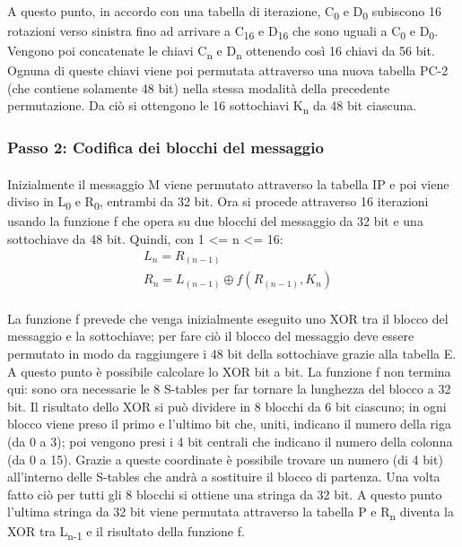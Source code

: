 \documentclass{article}
\begin{document}
				\paragraph{}
				A questo punto, in accordo con una tabella di iterazione, C\textsubscript{0} e D\textsubscript{0} subiscono 16 rotazioni verso sinistra fino ad arrivare a C\textsubscript{16} e D\textsubscript{16} che sono uguali a C\textsubscript{0} e D\textsubscript{0}. Vengono poi concatenate le chiavi C\textsubscript{n} e D\textsubscript{n} ottenendo così 16 chiavi da 56 bit. \newline
				Ognuna di queste chiavi viene poi permutata attraverso una nuova tabella PC-2 (che contiene solamente 48 bit) nella stessa modalità della precedente permutazione. Da ciò si ottengono le 16 sottochiavi K\textsubscript{n} da 48 bit ciascuna.

			\subsubsection{Passo 2: Codifica dei blocchi del messaggio}

				\paragraph{}
				Inizialmente il messaggio M viene permutato attraverso la tabella IP e poi viene diviso in L\textsubscript{0} e R\textsubscript{0}, entrambi da 32 bit. \newline
				Ora si procede attraverso 16 iterazioni usando la funzione f che opera su due blocchi del messaggio da 32 bit e una sottochiave da 48 bit. \newline
				Quindi, con 1 <= n <= 16:
				\begin{align*}
				&L_n = R_(n-1)\\
				&R_n = L_(n-1) \oplus f(R_(n-1), K_n)
				\end{align*}
				\paragraph{}
				La funzione f prevede che venga inizialmente eseguito uno XOR tra il blocco del messaggio e la sottochiave; per fare ciò il blocco del messaggio deve essere permutato in modo da raggiungere i 48 bit della sottochiave grazie alla tabella E. A questo punto è possibile calcolare lo XOR bit a bit. \newline
				La funzione f non termina qui: sono ora necessarie le 8 S-tables per far tornare la lunghezza del blocco a 32 bit. Il risultato dello XOR si può dividere in 8 blocchi da 6 bit ciascuno; in ogni blocco viene preso il primo e l'ultimo bit che, uniti, indicano il numero della riga (da 0 a 3); poi vengono presi i 4 bit centrali che indicano il numero della colonna (da 0 a 15). Grazie a queste coordinate è possibile trovare un numero (di 4 bit) all'interno delle S-tables che andrà a sostituire il blocco di partenza. Una volta fatto ciò per tutti gli 8 blocchi si ottiene una stringa da 32 bit. A questo punto l'ultima stringa da 32 bit viene permutata attraverso la tabella P e R\textsubscript{n} diventa la XOR tra L\textsubscript{n-1} e il risultato della funzione f.
\end{document}
